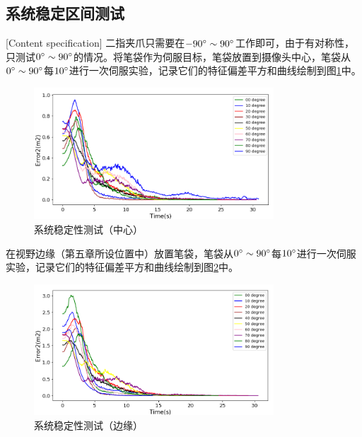 \documentclass[fontset=fandol,type=bachelor,campus=harbin,bsmainpagenumberline=true]{hithesisbook}
\begin{document}
\subsection{系统稳定区间测试}[Content specification]
二指夹爪只需要在$-90\degree\sim90\degree$工作即可，由于有对称性，只测试$0\degree\sim90\degree$的情况。将笔袋作为伺服目标，笔袋放置到摄像头中心，笔袋从$0\degree\sim90\degree$每$10\degree$进行一次伺服实验，记录它们的特征偏差平方和曲线绘制到图\ref{系统稳定特征偏差平方和（中心）}中。
\begin{figure}[h]
	\centering
	\includegraphics[width=0.8\textwidth]{chapter6/系统稳定性测试（中心）}
	\caption{系统稳定性测试（中心）}
	\label{系统稳定特征偏差平方和（中心）}
\end{figure}


在视野边缘（第五章所设位置中）放置笔袋，笔袋从$0\degree\sim90\degree$每$10\degree$进行一次伺服实验，记录它们的特征偏差平方和曲线绘制到图\ref{系统稳定特征偏差平方和（边缘）}中。
\begin{figure}[h]
	\centering
	\includegraphics[width=0.8\textwidth]{chapter6/系统稳定性测试（边缘）}
	\caption{系统稳定性测试（边缘）}
	\label{系统稳定特征偏差平方和（边缘）}
\end{figure}
\end{document}
